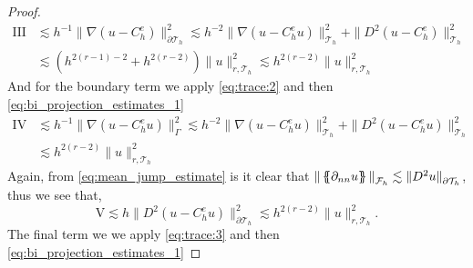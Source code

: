 \begin{proof}
\begin{equation}
\begin{split}
            \mathrm{III}  & \lesssim h^{-1} \|  \nabla ( u - C_{h}^{e})  \|_{\partial \mathcal{T}_{h}   }^{2  }  \lesssim h^{-2} \| \nabla ( u - C^{e}_{h}u)  \|_{ \mathcal{T} _{h}
                          }^{ 2 } + \|  D^2  ( u - C_{h}^{e})  \|_{\mathcal{T}_{h}   }^{ 2 } \\
                          & \lesssim  ( h ^{2( r-1) -2 } + h^{2( r-2) } ) \| u  \|_{r, \mathcal{T}_{h}   }^{2  }  \lesssim  h^{2( r-2) }  \| u  \|_{r, \mathcal{T}_{h}   }^{ 2 }
    \end{split}
\end{equation}
And for the boundary term we apply \eqref{eq:trace:2} and then \eqref{eq:bi_projection_estimates_1}
        \begin{equation}
            \begin{split}
            \mathrm{IV}   & \lesssim h^{-1} \|  \nabla  ( u - C_{h}^{e}u ) \|_{ \Gamma  }^{2  }    \lesssim h^{-2} \| \nabla ( u - C_{h}^{e}u )  \|_{ \mathcal{T}_{h}   }^{2  } + \| D^2( u - C_{h}^{e}u ) \|_{ \mathcal{T}_{h}   }^{ 2 } \\   & \lesssim  h^{2( r-2) }  \| u  \|_{r, \mathcal{T}_{h}   }^{ 2 }
            \end{split}
        \end{equation}
Again, from \eqref{eq:mean_jump_estimate} is it clear that $\| \left\{\!\!\left\{ \partial _{nn} u \right\}\!\!\right\}   \|_{ \mathcal{F}_{h}   }^{  } \lesssim \| D^2  u \|_{ \partial  \mathcal{T} _{h} }^{  }   $, thus we see that,
        \begin{equation}
            \mathrm{V}   \lesssim h \|  D^2  ( u - C_{h}^{e}u ) \|_{\partial \mathcal{T}_{h}}^{2  }  \lesssim  h^{2( r - 2 )} \| u \|_{r, \mathcal{T}_{h}   }^{ 2 }.
        \end{equation}
        The final term we we apply \eqref{eq:trace:3} and then \eqref{eq:bi_projection_estimates_1}


\end{proof}
